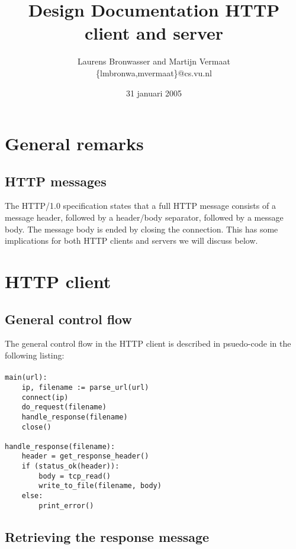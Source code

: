 \documentclass[11pt]{article}
\title{Design Documentation HTTP client and server}
\author{
    Laurens Bronwasser and Martijn Vermaat\\
    \{lmbronwa,mvermaat\}@cs.vu.nl
}
\date{31 januari 2005}
\begin{document}
\maketitle


\lstset{
  numbers=none,
  basicstyle=\small,
  frame=tb,
  language=Pascal,
  captionpos=b
}


\section{General remarks}


\subsection{HTTP messages}\label{sec:httpmessages}

The HTTP/1.0 specification states that a full HTTP message consists of a
message header, followed by a header/body separator, followed by a message
body. The message body is ended by closing the connection. This has some
implications for both HTTP clients and servers we will discuss below.


\section{HTTP client}


\subsection{General control flow}

The general control flow in the HTTP client is described in psuedo-code in the
following listing:

\paragraph{}

\begin{lstlisting}[title=HTTP client control flow]
main(url):
    ip, filename := parse_url(url)
    connect(ip)
    do_request(filename)
    handle_response(filename)
    close()

handle_response(filename):
    header = get_response_header()
    if (status_ok(header)):
        body = tcp_read()
        write_to_file(filename, body)
    else:
        print_error()
\end{lstlisting}


\subsection{Retrieving the response message}
\end{document}
